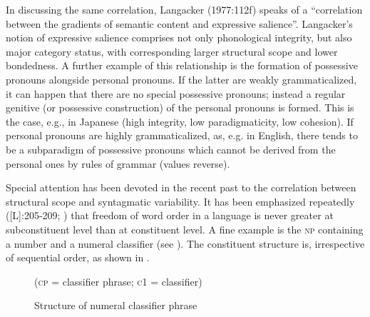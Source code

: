 In discussing the same correlation, Langacker (1977:112f) speaks of a “correlation between the gradients of semantic content and expressive salience”. Langacker's notion of expressive salience comprises not only phonological integrity, but also major category status, with corresponding larger structural scope and lower bondedness. A further example of this relationship is the formation of possessive pronouns alongside personal pronouns. If the latter are weakly grammaticalized, it can happen that there are no special possessive pronouns; instead a regular genitive (or possessive construction) of the personal pronouns is formed. This is the case, e.g., in Japanese (high integrity, low paradigmaticity, low cohesion). If personal pronouns are highly grammaticalized, as, e.g. in English, there tends to be a subparadigm of possessive pronouns which cannot be derived from the personal ones by rules of grammar (values reverse).

Special attention has been devoted in the recent past to the correlation between structural scope and syntagmatic variability. It has been emphasized repeatedly (\citet{Givón1979}[L]:205-209; \citet[80]{Comrie1981}) that freedom of word order in a language is never greater at subconstituent level than at constituent level. A fine example is the \textsc{np} containing a number and a numeral classifier (see \citet[29]{Greenberg1975}). The constituent structure is, irrespective of sequential order, as shown in .

\begin{figure}
	
	(\textsc{cp} = classifier phrase; \textsc{c1} = classifier)
	\caption{Structure of numeral classifier phrase} \label{F11}
\end{figure}

